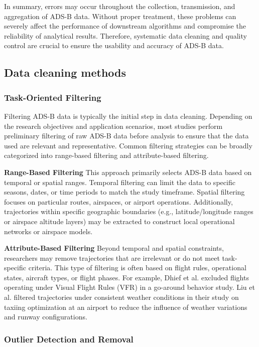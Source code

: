 In summary, errors may occur throughout the collection, transmission, and aggregation of ADS-B data. Without proper treatment, these problems can severely affect the performance of downstream algorithms and compromise the reliability of analytical results. Therefore, systematic data cleaning and quality control are crucial to ensure the usability and accuracy of ADS-B data.

\subsection {Data cleaning methods}
\subsubsection{Task-Oriented Filtering}
Filtering ADS-B data is typically the initial step in data cleaning. Depending on the research objectives and application scenarios, most studies perform preliminary filtering of raw ADS-B data before analysis to ensure that the data used are relevant and representative. Common filtering strategies can be broadly categorized into range-based filtering and attribute-based filtering.

\textbf{Range-Based Filtering}
This approach primarily selects ADS-B data based on temporal or spatial ranges. Temporal filtering can limit the data to specific seasons, dates, or time periods to match the study timeframe. Spatial filtering focuses on particular routes, airspaces, or airport operations. Additionally, trajectories within specific geographic boundaries (e.g., latitude/longitude ranges or airspace altitude layers) may be extracted to construct local operational networks or airspace models.

\textbf{Attribute-Based Filtering}
Beyond temporal and spatial constraints, researchers may remove trajectories that are irrelevant or do not meet task-specific criteria. This type of filtering is often based on flight rules, operational states, aircraft types, or flight phases. For example, Dhief et al. \cite{dhief2021tree} excluded flights operating under Visual Flight Rules (VFR) in a go-around behavior study. Liu et al. \cite{LIU2024104652} filtered trajectories under consistent weather conditions in their study on taxiing optimization at an airport to reduce the influence of weather variations and runway configurations.

\subsubsection{Outlier Detection and Removal} 

